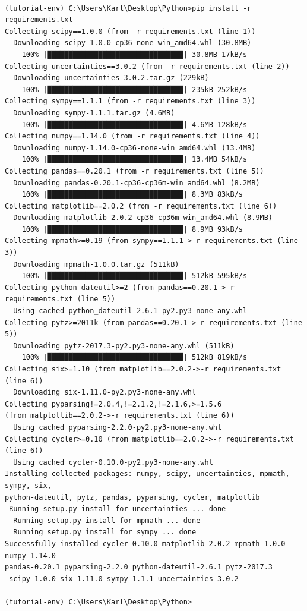 \documentclass[a4paper, 12pt]{article}
\begin{document}
\begin{footnotesize}
\begin{verbatim}

(tutorial-env) C:\Users\Karl\Desktop\Python>pip install -r requirements.txt
Collecting scipy==1.0.0 (from -r requirements.txt (line 1))
  Downloading scipy-1.0.0-cp36-none-win_amd64.whl (30.8MB)
    100% |████████████████████████████████| 30.8MB 17kB/s
Collecting uncertainties==3.0.2 (from -r requirements.txt (line 2))
  Downloading uncertainties-3.0.2.tar.gz (229kB)
    100% |████████████████████████████████| 235kB 252kB/s
Collecting sympy==1.1.1 (from -r requirements.txt (line 3))
  Downloading sympy-1.1.1.tar.gz (4.6MB)
    100% |████████████████████████████████| 4.6MB 128kB/s
Collecting numpy==1.14.0 (from -r requirements.txt (line 4))
  Downloading numpy-1.14.0-cp36-none-win_amd64.whl (13.4MB)
    100% |████████████████████████████████| 13.4MB 54kB/s
Collecting pandas==0.20.1 (from -r requirements.txt (line 5))
  Downloading pandas-0.20.1-cp36-cp36m-win_amd64.whl (8.2MB)
    100% |████████████████████████████████| 8.3MB 83kB/s
Collecting matplotlib==2.0.2 (from -r requirements.txt (line 6))
  Downloading matplotlib-2.0.2-cp36-cp36m-win_amd64.whl (8.9MB)
    100% |████████████████████████████████| 8.9MB 93kB/s
Collecting mpmath>=0.19 (from sympy==1.1.1->-r requirements.txt (line 3))
  Downloading mpmath-1.0.0.tar.gz (511kB)
    100% |████████████████████████████████| 512kB 595kB/s
Collecting python-dateutil>=2 (from pandas==0.20.1->-r requirements.txt (line 5))
  Using cached python_dateutil-2.6.1-py2.py3-none-any.whl
Collecting pytz>=2011k (from pandas==0.20.1->-r requirements.txt (line 5))
  Downloading pytz-2017.3-py2.py3-none-any.whl (511kB)
    100% |████████████████████████████████| 512kB 819kB/s
Collecting six>=1.10 (from matplotlib==2.0.2->-r requirements.txt (line 6))
  Downloading six-1.11.0-py2.py3-none-any.whl
Collecting pyparsing!=2.0.4,!=2.1.2,!=2.1.6,>=1.5.6 
(from matplotlib==2.0.2->-r requirements.txt (line 6))
  Using cached pyparsing-2.2.0-py2.py3-none-any.whl
Collecting cycler>=0.10 (from matplotlib==2.0.2->-r requirements.txt (line 6))
  Using cached cycler-0.10.0-py2.py3-none-any.whl
Installing collected packages: numpy, scipy, uncertainties, mpmath, sympy, six, 
python-dateutil, pytz, pandas, pyparsing, cycler, matplotlib 
 Running setup.py install for uncertainties ... done
  Running setup.py install for mpmath ... done
  Running setup.py install for sympy ... done
Successfully installed cycler-0.10.0 matplotlib-2.0.2 mpmath-1.0.0 numpy-1.14.0 
pandas-0.20.1 pyparsing-2.2.0 python-dateutil-2.6.1 pytz-2017.3
 scipy-1.0.0 six-1.11.0 sympy-1.1.1 uncertainties-3.0.2

(tutorial-env) C:\Users\Karl\Desktop\Python>
\end{verbatim}
\end{footnotesize}
\end{document}
